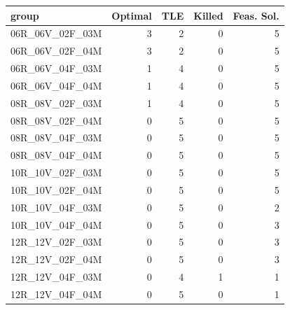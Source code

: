 
\begin{tabular}{lrrrr}
\toprule
group & Optimal & TLE & Killed & Feas. Sol.\\
\midrule
06R\_06V\_02F\_03M & 3 & 2 & 0 & 5\\
06R\_06V\_02F\_04M & 3 & 2 & 0 & 5\\
06R\_06V\_04F\_03M & 1 & 4 & 0 & 5\\
06R\_06V\_04F\_04M & 1 & 4 & 0 & 5\\
08R\_08V\_02F\_03M & 1 & 4 & 0 & 5\\
\addlinespace
08R\_08V\_02F\_04M & 0 & 5 & 0 & 5\\
08R\_08V\_04F\_03M & 0 & 5 & 0 & 5\\
08R\_08V\_04F\_04M & 0 & 5 & 0 & 5\\
10R\_10V\_02F\_03M & 0 & 5 & 0 & 5\\
10R\_10V\_02F\_04M & 0 & 5 & 0 & 5\\
\addlinespace
10R\_10V\_04F\_03M & 0 & 5 & 0 & 2\\
10R\_10V\_04F\_04M & 0 & 5 & 0 & 3\\
12R\_12V\_02F\_03M & 0 & 5 & 0 & 3\\
12R\_12V\_02F\_04M & 0 & 5 & 0 & 3\\
12R\_12V\_04F\_03M & 0 & 4 & 1 & 1\\
\addlinespace
12R\_12V\_04F\_04M & 0 & 5 & 0 & 1\\
\bottomrule
\end{tabular}
